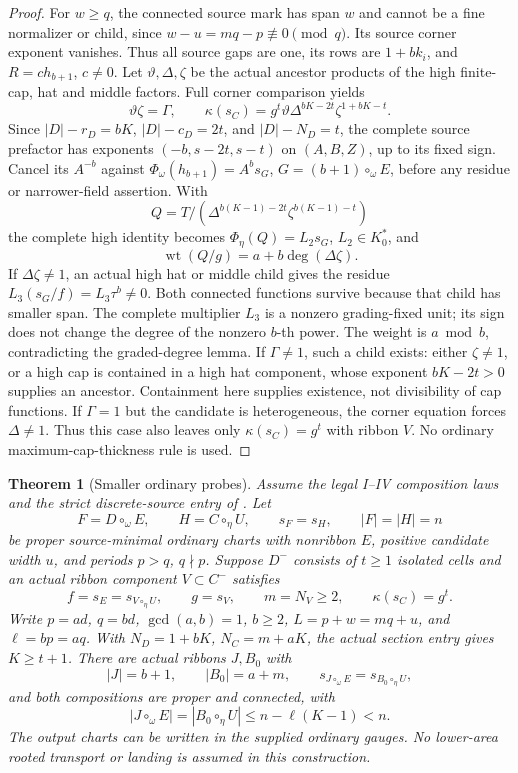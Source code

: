 \documentclass[11pt,a4paper]{amsart}
\numberwithin{equation}{section}
\theoremstyle{plain}
\newtheorem{theorem}{Theorem}[section]
\theoremstyle{definition}
\begin{document}
\begin{proof}
For \(w\ge q\), the connected source mark has span \(w\) and cannot be a fine normalizer or child, since \(w-u=mq-p\not\equiv0\pmod q\).  Its source corner exponent vanishes.  Thus all source gaps are one, its rows are \(1+bk_i\), and \(R=c h_{b+1}\), \(c\ne0\).  Let \(\vartheta,\Delta,\zeta\) be the actual ancestor products of the high finite-cap, hat and middle factors.  Full corner comparison yields
\[
 \vartheta\zeta=\Gamma,\qquad
 \kappa(s_C)=g^t\vartheta\Delta^{bK-2t}\zeta^{1+bK-t}.
\]
Since \(|D|-r_D=bK\), \(|D|-c_D=2t\), and \(|D|-N_D=t\), the complete source prefactor has exponents \((-b,s-2t,s-t)\) on \((A,B,Z)\), up to its fixed sign.  Cancel its \(A^{-b}\) against \(\Phi_\omega(h_{b+1})=A^bs_G\), \(G=(b+1)\circ_\omega E\), before any residue or narrower-field assertion.  With
\[
 Q=T/(\Delta^{b(K-1)-2t}\zeta^{b(K-1)-t})
\]
the complete high identity becomes \(\Phi_\eta(Q)=L_2s_G\), \(L_2\in K_0^*\), and
\[
 \operatorname{wt}(Q/g)=a+b\deg(\Delta\zeta).
\]
If \(\Delta\zeta\ne1\), an actual high hat or middle child gives the residue \(L_3(s_G/f)=L_3\tau^b\ne0\).  Both connected functions survive because that child has smaller span.  The complete multiplier \(L_3\) is a nonzero grading-fixed unit; its sign does not change the degree of the nonzero \(b\)-th power.  The weight is \(a\bmod b\), contradicting the graded-degree lemma.  If \(\Gamma\ne1\), such a child exists: either \(\zeta\ne1\), or a high cap is contained in a high hat component, whose exponent \(bK-2t>0\) supplies an ancestor.  Containment here supplies existence, not divisibility of cap functions.  If \(\Gamma=1\) but the candidate is heterogeneous, the corner equation forces \(\Delta\ne1\).  Thus this case also leaves only \(\kappa(s_C)=g^t\) with ribbon \(V\).  No ordinary maximum-cap-thickness rule is used.
\end{proof}

\begin{theorem}[Smaller ordinary probes]\label{thm:ordinary-probes}
Assume the legal I--IV composition laws and the strict discrete-source entry of .  Let
\[
 F=D\circ_\omega E,\qquad H=C\circ_\eta U,\qquad
 s_F=s_H,\qquad |F|=|H|=n
\]
be proper source-minimal ordinary charts with nonribbon \(E\), positive candidate width \(u\), and periods \(p>q\), \(q\nmid p\).  Suppose \(D^-\) consists of \(t\ge1\) isolated cells and an actual ribbon component \(V\subset C^-\) satisfies
\[
 f=s_E=s_{V\circ_\eta U},\qquad g=s_V,\qquad
 m=N_V\ge2,\qquad\kappa(s_C)=g^t.
\]
Write \(p=ad\), \(q=bd\), \(\gcd(a,b)=1\), \(b\ge2\), \(L=p+w=mq+u\), and \(\ell=bp=aq\).  With \(N_D=1+bK\), \(N_C=m+aK\), the actual section entry gives \(K\ge t+1\).  There are actual ribbons \(J,B_0\) with
\[
 |J|=b+1,\qquad |B_0|=a+m,
 \qquad s_{J\circ_\omega E}=s_{B_0\circ_\eta U},
\]
and both compositions are proper and connected, with
\[
 |J\circ_\omega E|=|B_0\circ_\eta U|
 \le n-\ell(K-1)<n.
\]
The output charts can be written in the supplied ordinary gauges.  No lower-area rooted transport or landing is assumed in this construction.
\end{theorem}
\end{document}
